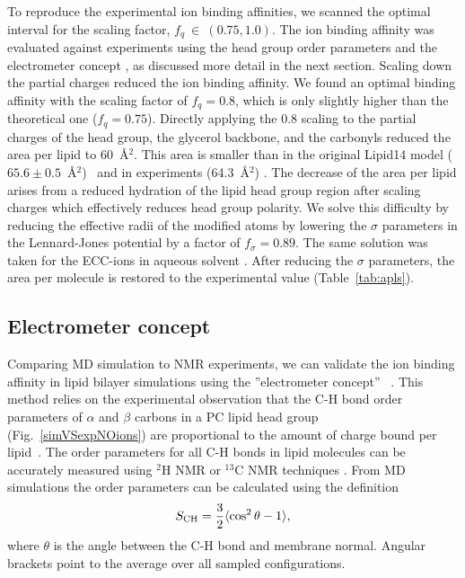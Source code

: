 \documentclass[aip,jcp,twocolumn]{revtex4}
\begin{document}
To reproduce the experimental ion binding affinities,
we scanned the optimal interval for the scaling factor, $f_q~\in~(0.75, 1.0)$.
The ion binding affinity was evaluated against experiments
using the head group order parameters and the electrometer concept \cite{seelig87,catte16},
as discussed more detail in the next section.
Scaling down the partial charges reduced the ion binding affinity.
We found an optimal binding affinity with the scaling factor of $f_q = 0.8$,
which is only slightly higher than the theoretical one ($f_q=0.75$).
Directly applying
the 0.8 scaling to the partial charges of the head group, the glycerol backbone, and
the carbonyls reduced the area per lipid to 60~\AA$^2$. This area is smaller than in the
original Lipid14 model ($65.6 \pm 0.5$~\AA$^2$)~\cite{dickson14} and in experiments
(64.3~\AA$^2$) \cite{kucerka11}. The decrease of the area per lipid arises from a
reduced hydration of the lipid head group region after scaling charges which effectively
reduces head group polarity. We solve this difficulty by reducing the effective radii of
the modified atoms by lowering the $\sigma$ parameters in the Lennard-Jones potential by a
factor of $f_\sigma = 0.89$. The same solution was taken for the ECC-ions in aqueous
solvent \cite{kohagen14, kohagen16, Pluharova2014, martinek17}. After reducing the $\sigma$ parameters,
the area per molecule is restored to the experimental value (Table~\ref{tab:apls}). 




\subsection{Electrometer concept} \label{section:electrometer}
Comparing MD simulation to NMR experiments, we can validate the ion
binding affinity in lipid bilayer simulations using the ''electrometer concept''~ \cite{seelig87, catte16}.
This method relies on the experimental observation that the C-H bond order parameters of $\alpha$ and $\beta$ carbons in a PC lipid head group (Fig.~\ref{simVSexpNOions}) are proportional to the amount of charge bound per lipid~\cite{seelig87}.
The order parameters for all C-H bonds in lipid molecules can be accurately measured using $^2$H NMR or $^{13}$C NMR techniques \cite{ollila16}. From MD simulations the order parameters can be calculated using the definition
\begin{equation}\label{OP}
S_{\rm CH}=\frac{3}{2}\langle \cos^2\theta -1 \rangle,
\end{equation}
where $\theta$ is the angle between the C-H bond and membrane normal. Angular brackets point to the average over all sampled configurations.
\end{document}
